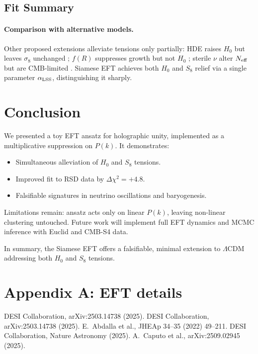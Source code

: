 \documentclass[11pt,a4paper]{article}
\begin{document}
\subsection*{Fit Summary}

\paragraph{Comparison with alternative models.}
Other proposed extensions alleviate tensions only partially:  
HDE raises $H_0$ but leaves $\sigma_8$ unchanged \cite{HoloDE2025};  
$f(R)$ suppresses growth but not $H_0$ \cite{Abdalla2022};  
sterile $\nu$ alter $N_{\rm eff}$ but are CMB-limited \cite{DESI2025Nature}.  
Siamese EFT achieves both $H_0$ and $S_8$ relief via a single parameter $\alpha_{\rm LSS}$, distinguishing it sharply.

\section{Conclusion}
We presented a toy EFT ansatz for holographic unity, implemented as a multiplicative suppression on $P(k)$. It demonstrates:

\begin{itemize}
    \item Simultaneous alleviation of $H_0$ and $S_8$ tensions.  
    \item Improved fit to RSD data by $\Delta\chi^2=+4.8$.  
    \item Falsifiable signatures in neutrino oscillations and baryogenesis.  
\end{itemize}

Limitations remain: ansatz acts only on linear $P(k)$, leaving non-linear clustering untouched. Future work will implement full EFT dynamics and MCMC inference with Euclid and CMB-S4 data.

In summary, the Siamese EFT offers a falsifiable, minimal extension to $\Lambda$CDM addressing both $H_0$ and $S_8$ tensions.

\appendix
\section*{Appendix A: EFT details}

\begin{thebibliography}{99}\setlength{\itemsep}{2pt}
 DESI Collaboration, arXiv:2503.14738 (2025).
 DESI Collaboration, arXiv:2503.14738 (2025).
 E.~Abdalla et al., JHEAp 34--35 (2022) 49--211.
 DESI Collaboration, Nature Astronomy (2025).
 A.~Caputo et al., arXiv:2509.02945 (2025).
\end{thebibliography}
\end{document}
